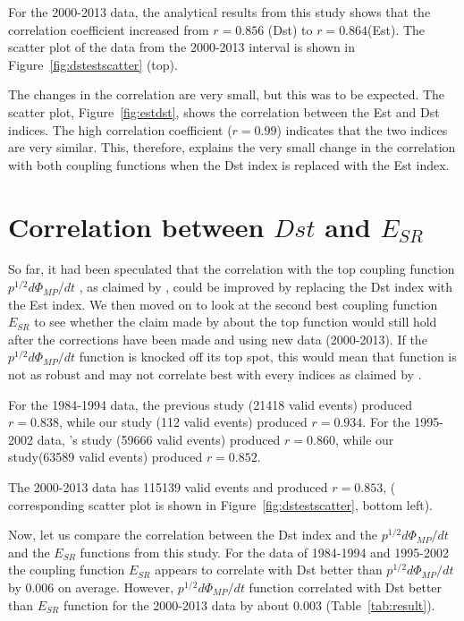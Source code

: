\documentclass[12pt]{report} %
\begin{document}
For the 2000-2013 data, the analytical results from this study shows that the correlation coefficient increased from $r= 0.856$ (Dst) to $r=0.864$(Est). The scatter plot of the data from the 2000-2013 interval is shown in Figure~\ref{fig:dstestscatter} (top). 

The changes in the correlation are very small, but this was to be expected. The scatter plot, Figure~\ref{fig:estdst}, shows the correlation between the Est and Dst indices. The high correlation coefficient ($r=0.99$) indicates that the two indices are very similar. This, therefore, explains the very small change in the correlation with both coupling functions when the Dst index is replaced with the Est index. 

\vspace{0pt}
\section{Correlation between $Dst$ and $E_{SR}$}
\vspace{-5pt}

So far, it had been speculated that the correlation with the top coupling function $p^{1/2}d\Phi_{MP}/dt$ , as claimed by \cite{newell07}, could be improved by replacing the Dst index with the Est index. We then moved on to look at the second best coupling function $E_{SR}$ to see whether the claim made by \cite{newell07} about the top function would still hold after the corrections have been made and using new data (2000-2013). If the $p^{1/2}d\Phi_{MP}/dt$ function is knocked off its top spot, this would mean that function is not as robust and may not correlate best with every indices as claimed by \cite{newell07}.

For the 1984-1994 data, the previous study (21418 valid events) produced $r=0.838$, while our study (112 valid events) produced $r=0.934$. For the 1995-2002 data, \cite{newell07}'s study (59666 valid events) produced $r=0.860$, while our study(63589 valid events) produced $r=0.852$. 

The 2000-2013 data has 115139 valid events and produced $r=0.853$, ( corresponding scatter plot is shown in Figure~\ref{fig:dstestscatter}, bottom left).

Now, let us compare the correlation between the Dst index and the ${p^{1/2}d\Phi_{MP}/dt}$ and the $E_{SR}$ functions from this study. For the data of 1984-1994 and 1995-2002 the coupling function $E_{SR}$ appears to correlate with Dst better than ${p^{1/2}d\Phi_{MP}/dt}$ by 0.006 on average. However, ${p^{1/2}d\Phi_{MP}/dt}$ function correlated with Dst better than $E_{SR}$ function for the 2000-2013 data by about 0.003 (Table~\ref{tab:result}). 
\end{document}
